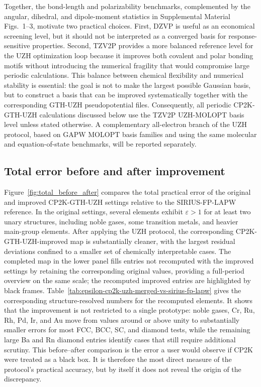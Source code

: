 \documentclass[aps,prb,reprint,amsmath,amssymb,superscriptaddress,longbibliography,floatfix]{revtex4-2}
\begin{document}
Together, the bond-length and polarizability benchmarks, complemented by the angular, dihedral, and dipole-moment statistics in Supplemental Material Figs.~1--3, motivate two practical choices. First, DZVP is useful as an economical screening level, but it should not be interpreted as a converged basis for response-sensitive properties. Second, TZV2P provides a more balanced reference level for the UZH optimization loop because it improves both covalent and polar bonding motifs without introducing the numerical fragility that would compromise large periodic calculations. This balance between chemical flexibility and numerical stability is essential: the goal is not to make the largest possible Gaussian basis, but to construct a basis that can be improved systematically together with the corresponding GTH-UZH pseudopotential files. Consequently, all periodic CP2K-GTH-UZH calculations discussed below use the TZV2P UZH-MOLOPT basis level unless stated otherwise. A complementary all-electron branch of the UZH protocol, based on GAPW MOLOPT basis families and using the same molecular and equation-of-state benchmarks, will be reported separately.

\subsection{Total error before and after improvement}

Figure~\ref{fig:total_before_after} compares the total practical error of the original and improved CP2K-GTH-UZH settings relative to the SIRIUS-FP-LAPW reference. In the original settings, several elements exhibit $\varepsilon>1$ for at least two unary structures, including noble gases, some transition metals, and heavier main-group elements. After applying the UZH protocol, the corresponding CP2K-GTH-UZH-improved map is substantially cleaner, with the largest residual deviations confined to a smaller set of chemically interpretable cases. The completed map in the lower panel fills entries not recomputed with the improved settings by retaining the corresponding original values, providing a full-period overview on the same scale; the recomputed improved entries are highlighted by black frames. Table~\ref{tab:epsilon-cp2k-uzh-merged-vs-sirius-fp-lapw} gives the corresponding structure-resolved numbers for the recomputed elements. It shows that the improvement is not restricted to a single prototype: noble gases, Cr, Ru, Rh, Pd, Ir, and Au move from values around or above unity to substantially smaller errors for most FCC, BCC, SC, and diamond tests, while the remaining large Ba and Rn diamond entries identify cases that still require additional scrutiny. This before--after comparison is the error a user would observe if CP2K were treated as a black box. It is therefore the most direct measure of the protocol's practical accuracy, but by itself it does not reveal the origin of the discrepancy.
\end{document}
